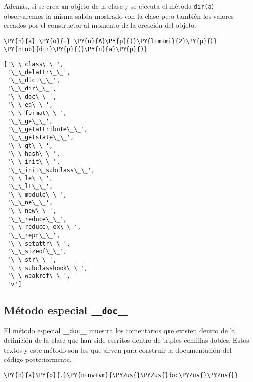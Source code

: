 Además, si se crea un objeto de la clase y se ejecuta el método
\texttt{dir(a)} observaremos la misma salida mostrado con la clase pero
también los valores creados por el constructor al momento de la creación
del objeto.

\begin{tcolorbox}[breakable, size=fbox, boxrule=1pt, pad at break*=1mm,colback=cellbackground, colframe=cellborder]
\begin{Verbatim}[commandchars=\\\{\}]
\PY{n}{a} \PY{o}{=} \PY{n}{A}\PY{p}{(}\PY{l+m+mi}{2}\PY{p}{)}
\PY{n+nb}{dir}\PY{p}{(}\PY{n}{a}\PY{p}{)}
\end{Verbatim}
\end{tcolorbox}

\begin{tcolorbox}[breakable, size=fbox, boxrule=.5pt, pad at break*=1mm, opacityfill=0]
\begin{Verbatim}[commandchars=\\\{\}]
['\_\_class\_\_',
 '\_\_delattr\_\_',
 '\_\_dict\_\_',
 '\_\_dir\_\_',
 '\_\_doc\_\_',
 '\_\_eq\_\_',
 '\_\_format\_\_',
 '\_\_ge\_\_',
 '\_\_getattribute\_\_',
 '\_\_getstate\_\_',
 '\_\_gt\_\_',
 '\_\_hash\_\_',
 '\_\_init\_\_',
 '\_\_init\_subclass\_\_',
 '\_\_le\_\_',
 '\_\_lt\_\_',
 '\_\_module\_\_',
 '\_\_ne\_\_',
 '\_\_new\_\_',
 '\_\_reduce\_\_',
 '\_\_reduce\_ex\_\_',
 '\_\_repr\_\_',
 '\_\_setattr\_\_',
 '\_\_sizeof\_\_',
 '\_\_str\_\_',
 '\_\_subclasshook\_\_',
 '\_\_weakref\_\_',
 'v']
\end{Verbatim}
\end{tcolorbox}
        
\subsection{\texorpdfstring{Método especial \texttt{\_\_doc\_\_}}{Método especial \_\_doc\_\_}}

El método especial \texttt{\_\_doc\_\_} muestra los comentarios que
existen dentro de la definición de la clase que han sido escritos dentro
de triples comillas dobles. Estos textos y este método son los que
sirven para construir la documentación del código posteriormente.

\begin{tcolorbox}[breakable, size=fbox, boxrule=1pt, pad at break*=1mm,colback=cellbackground, colframe=cellborder]
\begin{Verbatim}[commandchars=\\\{\}]
\PY{n}{a}\PY{o}{.}\PY{n+nv+vm}{\PYZus{}\PYZus{}doc\PYZus{}\PYZus{}}
\end{Verbatim}
\end{tcolorbox}

